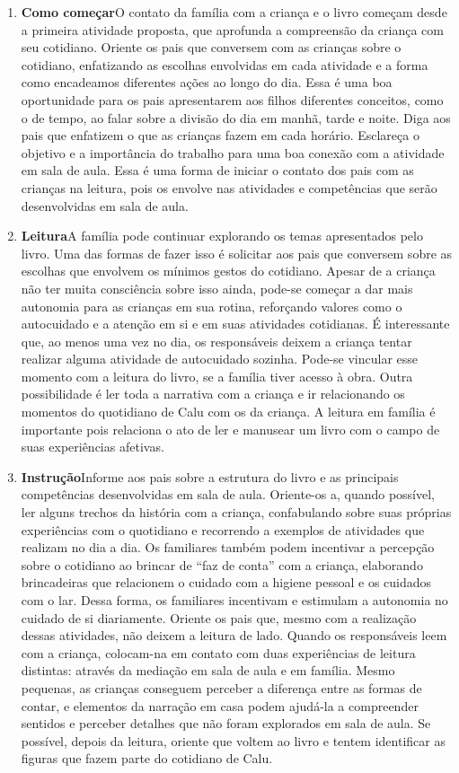 \documentclass[11pt]{extarticle}
\begin{document}
\begin{enumerate}
\item \textbf{Como começar}\quad O contato da família com a criança e o livro começam desde a primeira atividade proposta, que aprofunda a compreensão da criança com seu cotidiano. 
Oriente os pais que conversem com as crianças sobre o cotidiano, enfatizando as escolhas envolvidas em cada atividade e a forma como encadeamos diferentes ações ao longo do dia. Essa é uma boa oportunidade para os pais apresentarem aos filhos diferentes conceitos, como o de tempo, ao falar sobre a divisão do dia em manhã, tarde e noite. Diga aos pais que enfatizem o que as crianças fazem em cada horário. Esclareça o objetivo e a importância do trabalho para uma boa conexão com a atividade em sala de aula. 
Essa é uma forma de iniciar o contato dos pais com as crianças na leitura, pois os envolve nas atividades e competências que serão desenvolvidas em sala de aula.


\item \textbf{Leitura}\quad A família pode continuar 
explorando os temas apresentados pelo livro. Uma das formas de fazer isso é solicitar aos pais que conversem sobre as escolhas que envolvem os mínimos gestos do cotidiano. Apesar de a criança não ter muita consciência sobre isso ainda, pode-se começar a dar mais autonomia para as crianças em sua rotina, reforçando valores como o autocuidado e a atenção em si e em suas atividades cotidianas. É interessante que, ao menos uma vez no dia, os responsáveis deixem a criança tentar realizar alguma atividade de autocuidado sozinha.
Pode-se vincular esse momento com a leitura do livro, se a família tiver acesso à obra.
Outra possibilidade é ler toda a narrativa com a criança e ir relacionando os momentos do quotidiano de Calu com os da criança. A leitura em família é importante pois relaciona o ato de ler e manusear um livro com o campo de suas experiências afetivas.


\item \textbf{Instrução}\quad Informe aos pais sobre a estrutura do livro e as principais competências desenvolvidas em sala de aula.
Oriente-os a, quando possível, ler alguns trechos da história com a criança, confabulando sobre suas próprias experiências com o quotidiano e recorrendo a exemplos de atividades que realizam no dia a dia.
Os familiares também podem incentivar a percepção sobre o cotidiano ao brincar de ``faz de conta'' com a criança, elaborando brincadeiras que relacionem o cuidado com a higiene pessoal e os cuidados com o lar. Dessa forma, os familiares incentivam e estimulam a autonomia no cuidado de si diariamente.
Oriente os pais que, mesmo com a realização dessas atividades, não deixem a leitura de lado.
Quando os responsáveis leem com a criança, colocam-na em contato com duas experiências de leitura distintas: através da mediação em sala de aula e em família. 
Mesmo pequenas, as crianças conseguem perceber a diferença entre 
as formas de contar, e elementos da narração em casa podem ajudá-la a compreender 
sentidos e perceber detalhes que não foram explorados em sala de aula. Se possível, depois da leitura, oriente que voltem ao livro e tentem identificar as figuras que fazem parte do cotidiano de Calu.


\end{enumerate}
\end{document}
